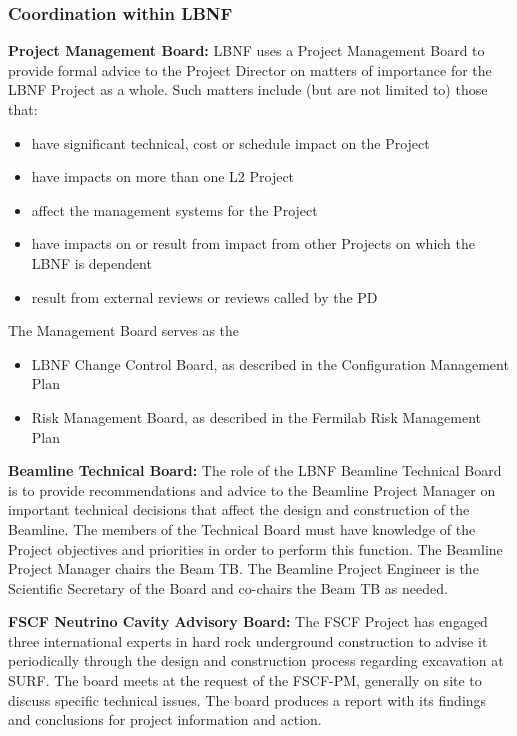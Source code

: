 \subsubsection{Coordination within LBNF}

\textbf{Project Management Board:} LBNF uses a Project Management Board to provide formal advice to the Project Director on matters of importance for the LBNF Project as a whole. Such matters include (but are not limited to) those that:
\begin{itemize}
\item have significant technical, cost or schedule impact on the Project
\item have impacts on more than one L2 Project
\item affect the management systems for the Project
\item have impacts on or result from impact from other Projects on which the LBNF is dependent
\item result from external reviews or reviews called by the PD
\end{itemize}
The Management Board serves as the
\begin{itemize}
\item LBNF Change Control Board, as described in the Configuration Management Plan \fixme{[ref]}
\item Risk Management Board, as described in the Fermilab Risk Management Plan  \fixme{[ref]}
\end{itemize}

\textbf{Beamline Technical Board:} The role of the LBNF Beamline Technical Board is to provide recommendations and advice to the Beamline Project Manager on important technical decisions that affect the design and construction of the Beamline. The members of the Technical Board must have knowledge of the Project objectives and priorities in order to perform this function. The Beamline Project Manager chairs the Beam TB. The Beamline Project Engineer is the Scientific Secretary of the Board and co-chairs the Beam TB as needed. 

\textbf{FSCF Neutrino Cavity Advisory Board:} The FSCF Project has engaged three international experts in hard rock underground construction to advise it periodically through the design and construction process regarding excavation at SURF. The board meets at the request of the FSCF-PM, generally on site to discuss specific technical issues. The board produces a report with its findings and conclusions for project information and action. 

